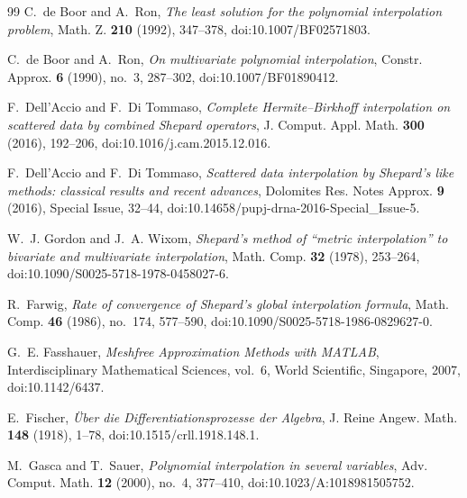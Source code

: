 \documentclass[12pt]{amsart}
\theoremstyle{definition}
\theoremstyle{remark}
\begin{document}
\begin{thebibliography}{99}
C.~de Boor and A.~Ron, \emph{The least solution for the polynomial interpolation problem}, Math.
Z. \textbf{210} (1992), 347--378, doi:10.1007/BF02571803.

C.~de Boor and A.~Ron, \emph{On multivariate polynomial interpolation}, Constr. Approx. \textbf{6} (1990), no.~3, 287--302, doi:10.1007/BF01890412.

F.~Dell'Accio and F.~Di Tommaso, \emph{Complete {H}ermite--{B}irkhoff interpolation on scattered
data by combined {S}hepard operators}, J. Comput. Appl. Math. \textbf{300} (2016), 192--206,
doi:10.1016/j.cam.2015.12.016.

F.~Dell'Accio and F.~Di Tommaso, \emph{Scattered data interpolation by {S}hepard's like methods:
classical results and recent advances}, Dolomites Res. Notes Approx. \textbf{9} (2016), Special
Issue, 32--44, doi:10.14658/pupj-drna-2016-Special\_Issue-5.

W.~J. Gordon and J.~A. Wixom, \emph{Shepard's method of ``metric interpolation'' to bivariate and
multivariate interpolation}, Math. Comp. \textbf{32} (1978), 253--264,
doi:10.1090/S0025-5718-1978-0458027-6.

R.~Farwig, \emph{Rate of convergence of {S}hepard's global interpolation formula}, Math. Comp.
\textbf{46} (1986), no.~174, 577--590, doi:10.1090/S0025-5718-1986-0829627-0.

G.~E. Fasshauer, \emph{Meshfree Approximation Methods with {MATLAB}}, Interdisciplinary Mathematical Sciences, vol.~6, World Scientific, Singapore, 2007, doi:10.1142/6437.

E.~Fischer, \emph{{\"U}ber die {D}ifferentiationsprozesse der {A}lgebra}, J. Reine Angew. Math. \textbf{148} (1918), 1--78, doi:10.1515/crll.1918.148.1.

M.~Gasca and T.~Sauer, \emph{Polynomial interpolation in several variables}, Adv. Comput. Math. \textbf{12} (2000), no.~4, 377--410, doi:10.1023/A:1018981505752.


\end{thebibliography}
\end{document}
